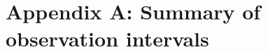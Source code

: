 \chapter{Appendix A: Summary of observation intervals}\label{appendix:observation-periods}


\renewcommand{\thechapter}{A}
\setcounter{table}{0}
\renewcommand{\thetable}{A.\arabic{table}}

\begin{landscape}
\begin{spacing}{.5}
    
    \label{tab:msh-observations}
\end{spacing}
\end{landscape}

\begin{landscape}
\begin{spacing}{.5}
    
    \label{tab:sw-observations}
\end{spacing}
\end{landscape}

\begin{landscape}
\begin{spacing}{.5}
    
\end{spacing}
\end{landscape}